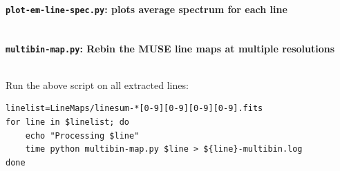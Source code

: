 \documentclass[preprint]{aastex}
\begin{document}
\paragraph{\texttt{plot-em-line-spec.py}: plots average spectrum for
  each line}
\inputminted[fontsize=\footnotesize]{python}{plot-em-line-spec.py}

\paragraph{\texttt{multibin-map.py}: Rebin the MUSE line maps at
  multiple resolutions}

\inputminted[fontsize=\footnotesize]{python}{multibin-map.py}

Run the above script on all extracted lines:
\begin{verbatim}
linelist=LineMaps/linesum-*[0-9][0-9][0-9][0-9].fits
for line in $linelist; do
    echo "Processing $line"
    time python multibin-map.py $line > ${line}-multibin.log
done
\end{verbatim}


\end{document}
